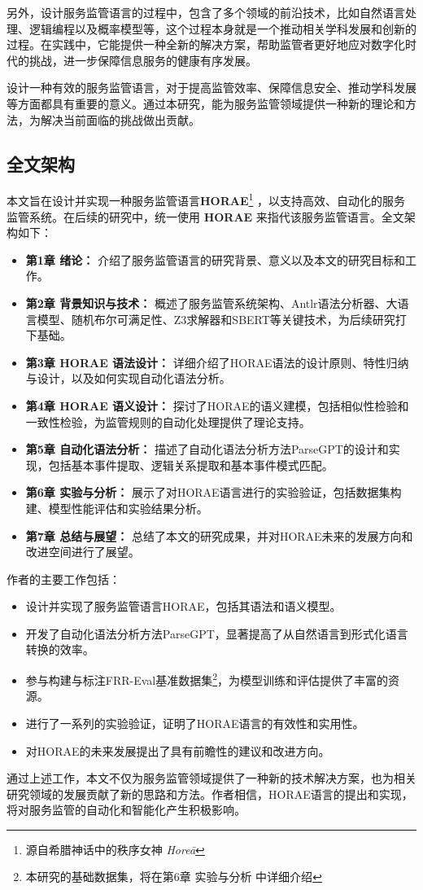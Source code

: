 另外，设计服务监管语言的过程中，包含了多个领域的前沿技术，比如自然语言处理、逻辑编程以及概率模型等，这个过程本身就是一个推动相关学科发展和创新的过程。在实践中，它能提供一种全新的解决方案，帮助监管者更好地应对数字化时代的挑战，进一步保障信息服务的健康有序发展。

设计一种有效的服务监管语言，对于提高监管效率、保障信息安全、推动学科发展等方面都具有重要的意义。通过本研究，能为服务监管领域提供一种新的理论和方法，为解决当前面临的挑战做出贡献。

\subsection{全文架构}

本文旨在设计并实现一种服务监管语言\textbf{HORAE}\footnote{源自希腊神话中的秩序女神 \textit{Horeā}} ，以支持高效、自动化的服务监管系统。在后续的研究中，统一使用 \textbf{HORAE } 来指代该服务监管语言。全文架构如下：

\begin{itemize}
    \item \textbf{第1章 绪论：} 介绍了服务监管语言的研究背景、意义以及本文的研究目标和工作。
    \item \textbf{第2章 背景知识与技术：} 概述了服务监管系统架构、Antlr语法分析器、大语言模型、随机布尔可满足性、Z3求解器和SBERT等关键技术，为后续研究打下基础。
    \item \textbf{第3章 HORAE 语法设计：} 详细介绍了HORAE语法的设计原则、特性归纳与设计，以及如何实现自动化语法分析。
    \item \textbf{第4章 HORAE 语义设计：} 探讨了HORAE的语义建模，包括相似性检验和一致性检验，为监管规则的自动化处理提供了理论支持。
    \item \textbf{第5章 自动化语法分析：} 描述了自动化语法分析方法ParseGPT的设计和实现，包括基本事件提取、逻辑关系提取和基本事件模式匹配。
    \item \textbf{第6章 实验与分析：} 展示了对HORAE语言进行的实验验证，包括数据集构建、模型性能评估和实验结果分析。
    \item \textbf{第7章 总结与展望：} 总结了本文的研究成果，并对HORAE未来的发展方向和改进空间进行了展望。
\end{itemize}

作者的主要工作包括：
\begin{itemize}
    \item 设计并实现了服务监管语言HORAE，包括其语法和语义模型。
    \item 开发了自动化语法分析方法ParseGPT，显著提高了从自然语言到形式化语言转换的效率。
    \item 参与构建与标注FRR-Eval基准数据集\footnote{本研究的基础数据集，将在第6章 实验与分析 中详细介绍}，为模型训练和评估提供了丰富的资源。
    \item 进行了一系列的实验验证，证明了HORAE语言的有效性和实用性。
    \item 对HORAE的未来发展提出了具有前瞻性的建议和改进方向。
\end{itemize}

通过上述工作，本文不仅为服务监管领域提供了一种新的技术解决方案，也为相关研究领域的发展贡献了新的思路和方法。作者相信，HORAE语言的提出和实现，将对服务监管的自动化和智能化产生积极影响。